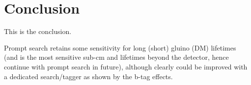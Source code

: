 \chapter{Conclusion}
\label{chap:conclusion}

This is the conclusion.

Prompt search retains some sensitivity 
for long (short) gluino (DM) lifetimes (and is the most sensitive sub-cm and 
lifetimes beyond the detector, hence continue with prompt search in future), 
although clearly could be improved with a dedicated search/tagger as shown by 
the b-tag effects.

\begin{comment}
Mention improvements using ML tagger for all displacements (extending the 
b-tagging algorithm) and list of things to take advantage in OB DM LL page 7.
see Rob_EXO_LL_tagger.
exploit jet id variables (eg chf etc), use ML/DL

References
Cloud model – Kraan, Rizzi (see stopped CMS)

\end{comment}


